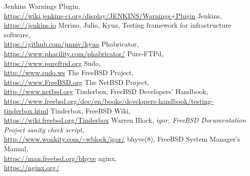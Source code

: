 \documentclass[a4paper,twocolumn,10pt]{article}
\begin{document}
\begin{thebibliography}{999}
 Jenkins Warnings Plugin,\\
\url{https://wiki.jenkins-ci.org/display/JENKINS/Warnings+Plugin}
 Jenkins,\\
\url{https://jenkins.io}
 Merino, Julio, Kyua, Testing framework for infrastructure software,\\
\url{https://github.com/jmmv/kyua}
 Phabricator,\\
\url{https://www.phacility.com/phabricator/}
 Pure-FTPd,\\
\url{https://www.pureftpd.org}
 Sudo,\\
\url{http://www.sudo.ws}
 The FreeBSD Project,\\
\url{https://www.FreeBSD.org}
 The NetBSD Project,\\
\url{http://www.netbsd.org}
 Tinderbox, FreeBSD Developers' Handbook,\\
\url{https://www.freebsd.org/doc/en/books/developers-handbook/testing-tinderbox.html}
 Tinderbox, FreeBSD Wiki,\\
\url{https://wiki.freebsd.org/Tinderbox}
 Warren Block, \textit{igor, FreeBSD Documentation Project sanity check script},\\
\url{http://www.wonkity.com/~wblock/igor/}
 bhyve(8), FreeBSD System Manager's Manual,\\
\url{https://man.freebsd.org/bhyve}
 nginx,\\
\url{https://nginx.org/}
\end{thebibliography}
\end{document}
